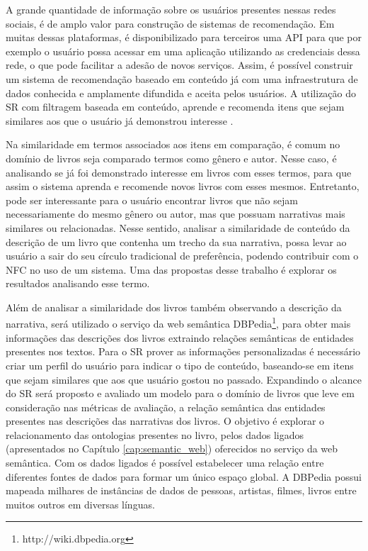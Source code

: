 A grande quantidade de informação sobre os usuários presentes nessas redes sociais, é de amplo valor para construção de sistemas de recomendação. Em muitas dessas plataformas, é disponibilizado para terceiros uma API para que por exemplo o usuário possa acessar em uma aplicação utilizando as credenciais dessa rede, o que pode facilitar a adesão de novos serviços. Assim, é possível construir um sistema de recomendação baseado em conteúdo já com uma infraestrutura de dados conhecida e amplamente difundida e aceita pelos usuários. A utilização do SR com filtragem baseada em conteúdo, aprende e recomenda itens que sejam similares aos que o usuário já demonstrou interesse \citep{Ricci2011}.

Na similaridade em termos associados aos itens em comparação, é comum no domínio de livros seja comparado termos como gênero e autor. Nesse caso, é analisando se já foi demonstrado interesse em livros com esses termos, para que assim o sistema aprenda e recomende novos livros com esses mesmos. Entretanto, pode ser interessante para o usuário encontrar livros que não sejam necessariamente do mesmo gênero ou autor, mas que possuam narrativas mais similares ou relacionadas. Nesse sentido, analisar a similaridade de conteúdo da descrição de um livro que contenha um trecho da sua narrativa, possa levar ao usuário a sair do seu círculo tradicional de preferência, podendo contribuir com o NFC no uso de um sistema. Uma das propostas desse trabalho é explorar os resultados analisando esse termo.

Além de analisar a similaridade dos livros também observando a descrição da narrativa, será utilizado o serviço da web semântica DBPedia\footnote{http://wiki.dbpedia.org}, para obter mais informações das descrições dos livros extraindo relações semânticas de entidades presentes nos textos. Para o SR prover as informações personalizadas é necessário criar um perfil do usuário para indicar o tipo de conteúdo, baseando-se em itens que sejam similares que aos que usuário gostou no passado. Expandindo o alcance do SR será proposto e avaliado um modelo para o domínio de livros que leve em consideração nas métricas de avaliação, a relação semântica das entidades presentes nas descrições das narrativas dos livros. O objetivo é explorar o relacionamento das ontologias presentes no livro, pelos dados ligados (apresentados no Capítulo \ref{cap:semantic_web}) oferecidos no serviço da web semântica. Com os dados ligados é possível estabelecer uma relação entre diferentes fontes de dados para formar um único espaço global. A DBPedia possui mapeada milhares de instâncias de dados de pessoas, artistas, filmes, livros entre muitos outros em diversas línguas.

